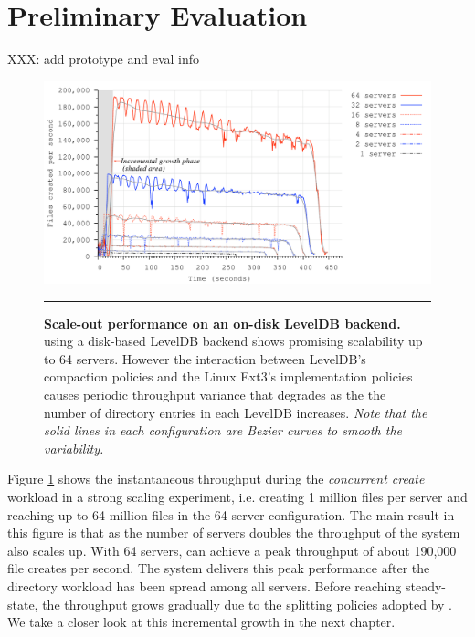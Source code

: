 \section{Preliminary Evaluation}

XXX: add prototype and eval info

\begin{figure}[t]  %
\centerline{\includegraphics[scale=0.33]{./figs/ldb_insertrate}}
\caption{
\textbf{Scale-out performance on an on-disk LevelDB backend.}
{\small
\giga{} using a disk-based LevelDB backend shows promising scalability
up to 64 servers. However the interaction between LevelDB's compaction policies and 
the Linux Ext3's implementation policies causes periodic throughput variance
that degrades as the the number of directory entries in each LevelDB
increases. \textit{Note that the solid lines in each configuration are Bezier
curves to smooth the variability.}
}
}
\vspace{15pt}
\hrule 
\label{graph:ldb-scaling}
\end{figure}       %

Figure \ref{graph:ldb-scaling} shows the instantaneous throughput during the 
\textit{concurrent create} workload in a strong scaling experiment, i.e.
creating 1 million files per server and reaching up to 64 million files in the
64 server configuration.
The main result in this figure is that as the number of servers doubles the
throughput of the system also scales up. With 64 servers, \giga{} can achieve a
peak throughput of about 190,000 file creates per second. The system delivers
this peak performance after the directory workload has been spread among all
servers.
Before reaching steady-state, the throughput grows gradually due to the splitting
policies adopted by \giga{}. We take a closer look at this incremental growth in
the next chapter.

